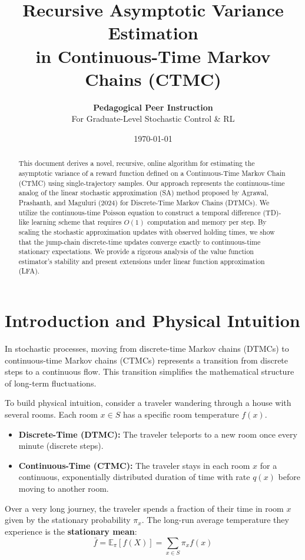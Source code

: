 \documentclass[11pt]{article}
\title{\textbf{Recursive Asymptotic Variance Estimation \\ in Continuous-Time Markov Chains (CTMC)}}
\author{\textbf{Pedagogical Peer Instruction} \\ For Graduate-Level Stochastic Control \& RL}
\date{\today}
\begin{document}
\maketitle

\begin{abstract}
This document derives a novel, recursive, online algorithm for estimating the asymptotic variance of a reward function defined on a Continuous-Time Markov Chain (CTMC) using single-trajectory samples. Our approach represents the continuous-time analog of the linear stochastic approximation (SA) method proposed by Agrawal, Prashanth, and Maguluri (2024) for Discrete-Time Markov Chains (DTMCs). We utilize the continuous-time Poisson equation to construct a temporal difference (TD)-like learning scheme that requires $O(1)$ computation and memory per step. By scaling the stochastic approximation updates with observed holding times, we show that the jump-chain discrete-time updates converge exactly to continuous-time stationary expectations. We provide a rigorous analysis of the value function estimator's stability and present extensions under linear function approximation (LFA).
\end{abstract}

\section{Introduction and Physical Intuition}

In stochastic processes, moving from discrete-time Markov chains (DTMCs) to continuous-time Markov chains (CTMCs) represents a transition from discrete steps to a continuous flow. This transition simplifies the mathematical structure of long-term fluctuations.

To build physical intuition, consider a traveler wandering through a house with several rooms. Each room $x \in S$ has a specific room temperature $f(x)$. 
\begin{itemize}
    \item \textbf{Discrete-Time (DTMC):} The traveler teleports to a new room once every minute (discrete steps).
    \item \textbf{Continuous-Time (CTMC):} The traveler stays in each room $x$ for a continuous, exponentially distributed duration of time with rate $q(x)$ before moving to another room.
\end{itemize}

Over a very long journey, the traveler spends a fraction of their time in room $x$ given by the stationary probability $\pi_x$. The long-run average temperature they experience is the \textbf{stationary mean}:
\begin{equation}
    \bar{f} = \mathbb{E}_\pi[f(X)] = \sum_{x \in S} \pi_x f(x)
\end{equation}
\end{document}

